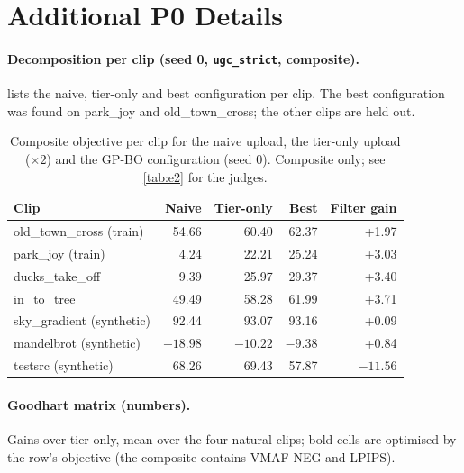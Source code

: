 \section{Additional P0 Details}
\label{app:p0}

\paragraph{Decomposition per clip (seed 0, \texttt{ugc\_strict}, composite).}
 lists the naive, tier-only and best configuration per clip. The best
configuration was found on park\_joy and old\_town\_cross; the other clips are held out.

\begin{table}[h]
  \centering
  \caption{Composite objective per clip for the naive upload, the tier-only upload ($\times2$) and the
  GP-BO configuration (seed 0). Composite only; see \cref{tab:e2} for the judges.}
  \label{tab:transfer}
  \begin{tabular}{@{}lrrrr@{}}
    \toprule
    Clip & Naive & Tier-only & Best & Filter gain \\
    \midrule
    old\_town\_cross (train) & 54.66 & 60.40 & 62.37 & +1.97 \\
    park\_joy (train)        & 4.24  & 22.21 & 25.24 & +3.03 \\
    ducks\_take\_off         & 9.39  & 25.97 & 29.37 & +3.40 \\
    in\_to\_tree             & 49.49 & 58.28 & 61.99 & +3.71 \\
    sky\_gradient (synthetic) & 92.44 & 93.07 & 93.16 & +0.09 \\
    mandelbrot (synthetic)   & $-18.98$ & $-10.22$ & $-9.38$ & +0.84 \\
    testsrc (synthetic)      & 68.26 & 69.43 & 57.87 & $-11.56$ \\
    \bottomrule
  \end{tabular}
\end{table}

\paragraph{Goodhart matrix (numbers).}
Gains over tier-only, mean over the four natural clips; bold cells are optimised by the row's
objective (the composite contains VMAF NEG and LPIPS).


